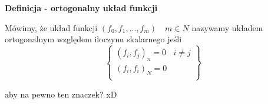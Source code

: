 \documentclass[polish]{kbk}
\begin{document}
\begin{center}
\textbf{Definicja - ortogonalny układ funkcji}
\end{center}
Mówimy, że układ funkcji \( (f_0, f_1,..., f_m)  \quad m \in N \) nazywamy układem ortogonalnym względem iloczynu skalarnego jeśli
  \[
    \left\{\begin{array}{lr}
        (f_i, f_j)_n = 0 & i \neq j\\
        (f_i, f_i)_N = 0 \\
        \end{array}\right\} 
  \]

\begin{thebibliography}{99}
 aby na pewno ten znaczek? xD

\end{thebibliography}
\end{document}
